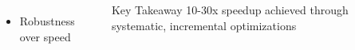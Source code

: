 \documentclass[serif, aspectratio=169, 9pt]{beamer}
\begin{document}
\begin{frame}
\begin{columns}
\begin{itemize}
            \item Robustness over speed
        \end{itemize}
        \vspace{0.3em}
        \begin{block}{Key Takeaway}
            10-30x speedup achieved through systematic, incremental optimizations
        \end{block}
    \end{columns}
\end{frame}
\end{document}
